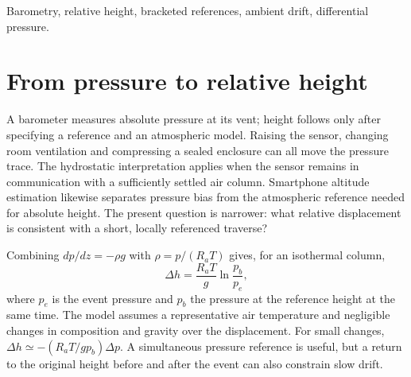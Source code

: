 \begin{abstract}
Metre-scale elevation changes produce small pressure differences that can be obscured by ambient drift. An LPS22HB example record is reduced using reference intervals before and after each event. Interpolation at the event's mean time gives pressure changes of $-0.132$ and $-0.351$~hPa, corresponding to height differences of 1.12 and 2.99~m for an isothermal air column at 293.15~K. A separate $+7.96$-hPa sealed-bag excursion demonstrates why a pressure change cannot be assigned a height without identifying its physical cause. The analysis makes the bracketed-reference estimator explicit and separates within-window scatter, calibration covariance and atmospheric-model uncertainty.
\end{abstract}
\begin{IEEEkeywords}
Barometry, relative height, bracketed references, ambient drift, differential pressure.
\end{IEEEkeywords}

\section{From pressure to relative height}
A barometer measures absolute pressure at its vent; height follows only after specifying a reference and an atmospheric model. Raising the sensor, changing room ventilation and compressing a sealed enclosure can all move the pressure trace. The hydrostatic interpretation applies when the sensor remains in communication with a sufficiently settled air column. Smartphone altitude estimation likewise separates pressure bias from the atmospheric reference needed for absolute height\cite{li2023altitude}. The present question is narrower: what relative displacement is consistent with a short, locally referenced traverse?

Combining $dp/dz=-\rho g$ with $\rho=p/(R_aT)$ gives, for an isothermal column,
\begin{equation}
 \Delta h=\frac{R_aT}{g}\ln\frac{p_b}{p_e},
 \label{eq:pressure-height}
\end{equation}
where $p_e$ is the event pressure and $p_b$ the pressure at the reference height at the same time. The model assumes a representative air temperature and negligible changes in composition and gravity over the displacement. For small changes, $\Delta h\simeq-(R_aT/gp_b)\Delta p$. A simultaneous pressure reference is useful, but a return to the original height before and after the event can also constrain slow drift.

